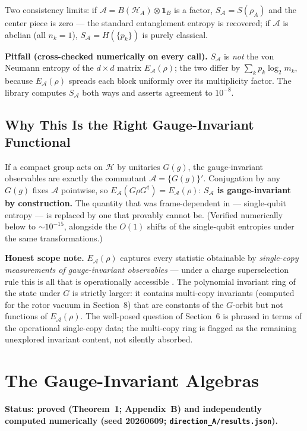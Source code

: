 \documentclass[11pt]{article}
\newcommand{\Alg}{\mathcal{A}}
\newcommand{\EA}{E_{\mathcal{A}}}
\newcommand{\SA}{S_{\mathcal{A}}}
\begin{document}
Two consistency limits: if $\Alg = B(\mathcal{H}_A) \otimes \mathbf{1}_B$ is a factor, $\SA = S(\rho_A)$ and the center piece is zero --- the standard entanglement entropy is recovered; if $\Alg$ is abelian (all $n_k = 1$), $\SA = H(\{p_k\})$ is purely classical.

\textbf{Pitfall (cross-checked numerically on every call).} $\SA$ is \emph{not} the von Neumann entropy of the $d \times d$ matrix $\EA(\rho)$; the two differ by $\sum_k p_k \log_2 m_k$, because $\EA(\rho)$ spreads each block uniformly over its multiplicity factor. The library computes $\SA$ both ways and asserts agreement to $10^{-8}$.

\subsection{Why This Is the Right Gauge-Invariant Functional}

If a compact group acts on $\mathcal{H}$ by unitaries $G(g)$, the gauge-invariant observables are exactly the commutant $\Alg = \{G(g)\}'$. Conjugation by any $G(g)$ fixes $\Alg$ pointwise, so $\EA(G\rho G^\dagger) = \EA(\rho)$: \textbf{$\SA$ is gauge-invariant by construction.} The quantity that was frame-dependent in \cite{companion} --- single-qubit entropy --- is replaced by one that provably cannot be. (Verified numerically below to $\sim$$10^{-15}$, alongside the $O(1)$ shifts of the single-qubit entropies under the same transformations.)

\textbf{Honest scope note.} $\EA(\rho)$ captures every statistic obtainable by \emph{single-copy measurements of gauge-invariant observables} --- under a charge superselection rule this is all that is operationally accessible \cite{brs}. The polynomial invariant ring of the state under $G$ is strictly larger: it contains multi-copy invariants (computed for the rotor vacuum in Section~8) that are constants of the $G$-orbit but not functions of $\EA(\rho)$. The well-posed question of Section~6 is phrased in terms of the operational single-copy data; the multi-copy ring is flagged as the remaining unexplored invariant content, not silently absorbed.

\section{The Gauge-Invariant Algebras}

\textbf{Status: proved (Theorem~1; Appendix~B) and independently computed numerically (seed 20260609; \texttt{direction\_A/results.json}).}
\end{document}

